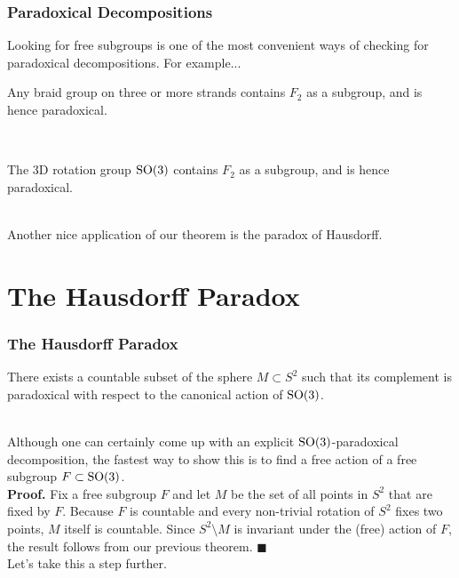 \documentclass{beamer}
\begin{document}
\begin{frame}
\frametitle{Paradoxical Decompositions}
Looking for free subgroups is one of the most convenient ways of checking for paradoxical decompositions. For example...\\[0.5\baselineskip]
\begin{example}
Any braid group on three or more strands contains $F_2$ as a subgroup, and is hence paradoxical.
\end{example}
\noindent\\[0.5\baselineskip]
\begin{example}
The 3D rotation group $\textup{SO}(3)$ contains $F_2$ as a subgroup, and is hence paradoxical.
\end{example}
\noindent\\[0.5\baselineskip] Another nice application of our theorem is the paradox of Hausdorff.
\end{frame}


\section{The Hausdorff Paradox}

\begin{frame}
\frametitle{The Hausdorff Paradox}
\begin{theorem}
There exists a countable subset of the sphere $M \subset S^2$ such that its complement is paradoxical with respect to the canonical action of $\textup{SO}(3)$.
\end{theorem}
\noindent\\[0.5\baselineskip] Although one can certainly come up with an explicit $\textup{SO}(3)$-paradoxical decomposition, the fastest way to show this is to find a free action of a free subgroup $F \subset \textup{SO}(3)$.\\[\baselineskip]

\textbf{Proof.} Fix a free subgroup $F$ and let $M$ be the set of all points in $S^2$ that are fixed by $F$. Because $F$ is countable and every non-trivial rotation of $S^2$ fixes two points, $M$ itself is countable. Since $S^2\setminus M$ is invariant under the (free) action of $F$, the result follows from our previous theorem. \hfill \ensuremath{\blacksquare}\\[\baselineskip]

Let's take this a step further.
\end{frame}
\end{document}
